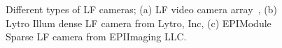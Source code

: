 

\begin{figure}[t]
    \centering
     \hfill

    \caption{Different types of LF cameras; (a) LF video camera array~\cite{LFVideoCamera}, (b) Lytro Illum dense LF camera from Lytro, Inc, (c) EPIModule Sparse LF camera from EPIImaging LLC.}
    \label{fig:LFcameras}
\end{figure}

